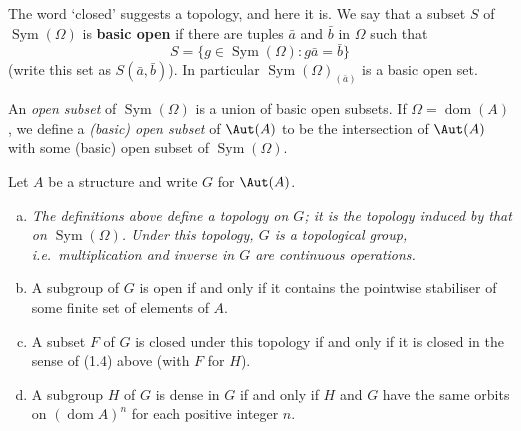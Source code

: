 The word ‘closed’ suggests a topology, and here it is. We say that a subset $S$ of $\operatorname{Sym}(\Omega)$ is \textbf{basic open} if there are tuples $\bar{a}$ and $\bar{b}$ in $\Omega$ such that
\[
    S = \{ g \in \operatorname{Sym}(\Omega) : g\bar{a} = \bar{b} \}
\]
(write this set as $S(\bar{a}, \bar{b})$). In particular $\operatorname{Sym}(\Omega)_{(\bar{a})}$ is a basic open set.

An \emph{open subset} of $\operatorname{Sym}(\Omega)$ is a union of basic open subsets. If $\Omega = \operatorname{dom}(A)$, we define a \emph{(basic) open subset} of $\Aut(A)$ to be the intersection of $\Aut(A)$ with some (basic) open subset of $\operatorname{Sym}(\Omega)$.


\begin{lemma}
    Let $A$ be a structure and write $G$ for $\Aut(A)$.
    \begin{enumerate}[(a)]
        \item \textit{The definitions above define a topology on $G$; it is the topology induced by that on $\operatorname{Sym}(\Omega)$. Under this topology, $G$ is a topological group, i.e.\ multiplication and inverse in $G$ are continuous operations.}
        \item A subgroup of $G$ is open if and only if it contains the pointwise stabiliser of some finite set of elements of $A$.
        \item A subset $F$ of $G$ is closed under this topology if and only if it is closed in the sense of (1.4) above (with $F$ for $H$).
        \item A subgroup $H$ of $G$ is dense in $G$ if and only if $H$ and $G$ have the same orbits on $(\operatorname{dom} A)^n$ for each positive integer $n$.
    \end{enumerate}
\end{lemma}

